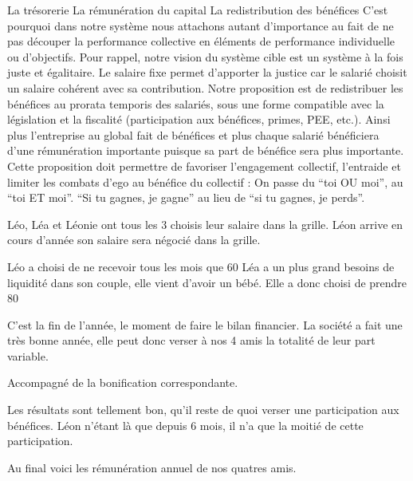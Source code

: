 \documentclass[12pt]{article}
\begin{document}
 La trésorerie
 La rémunération du capital
 La redistribution des bénéfices
 C’est pourquoi dans notre système nous attachons autant d’importance au fait de ne pas découper la performance collective en éléments de performance individuelle ou d'objectifs. Pour rappel, notre vision du système cible est un système à la fois juste et égalitaire. Le salaire fixe permet d’apporter la justice car le salarié choisit un salaire cohérent avec sa contribution. 
 Notre proposition est de redistribuer les bénéfices au prorata temporis des salariés, sous une forme compatible avec la législation et la fiscalité (participation aux bénéfices, primes, PEE, etc.).  Ainsi plus l'entreprise au global fait de bénéfices et plus chaque salarié bénéficiera d'une rémunération importante puisque sa part de bénéfice sera plus importante. Cette proposition doit permettre de favoriser l’engagement collectif, l’entraide et limiter les combats d’ego au bénéfice du collectif : On passe du “toi OU moi”, au “toi ET moi”. “Si tu gagnes, je gagne” au lieu de “si tu gagnes, je perds”.


 Léo, Léa et Léonie ont tous les 3 choisis leur salaire dans la grille. Léon arrive en cours d’année son salaire sera négocié dans la grille.

 Léo a choisi de ne recevoir tous les mois que 60%
 Léa a un plus grand besoins de liquidité dans son couple, elle vient d’avoir un bébé. Elle a donc choisi de prendre 80%

 C’est la fin de l’année, le moment de faire le bilan financier. La société a fait une très bonne année, elle peut donc verser à nos 4 amis la totalité de leur part variable.

 Accompagné de la bonification correspondante.

 Les résultats sont tellement bon, qu’il reste de quoi verser une participation aux bénéfices. Léon n’étant là que depuis 6 mois, il n’a que la moitié de cette participation.

 Au final voici les rémunération annuel de nos quatres amis.
\end{document}
